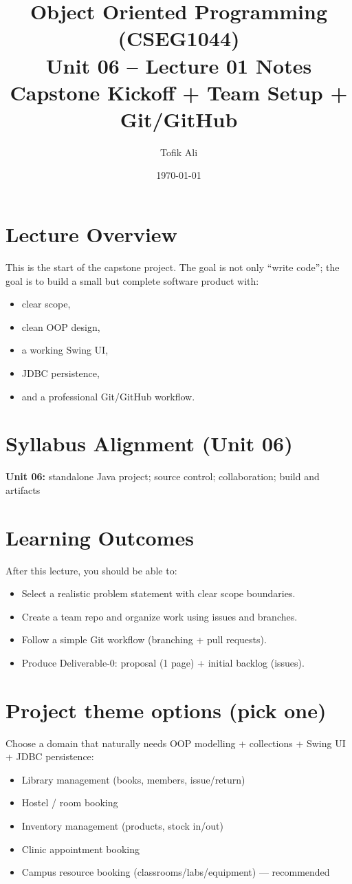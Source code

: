 \documentclass[11pt]{article}
\title{Object Oriented Programming (CSEG1044)\\Unit 06 -- Lecture 01 Notes\\Capstone Kickoff + Team Setup + Git/GitHub}
\author{Tofik Ali}
\date{\today}
\begin{document}
\maketitle
\tableofcontents

\section{Lecture Overview}
This is the start of the capstone project.
The goal is not only ``write code''; the goal is to build a small but complete software product with:
\begin{itemize}
  \item clear scope,
  \item clean OOP design,
  \item a working Swing UI,
  \item JDBC persistence,
  \item and a professional Git/GitHub workflow.
\end{itemize}
\notesources{\OOPSUnitVISources}

\section{Syllabus Alignment (Unit 06)}
\textbf{Unit 06:} standalone Java project; source control; collaboration; build and artifacts

\section{Learning Outcomes}
After this lecture, you should be able to:
\begin{itemize}
  \item Select a realistic problem statement with clear scope boundaries.
  \item Create a team repo and organize work using issues and branches.
  \item Follow a simple Git workflow (branching + pull requests).
  \item Produce Deliverable-0: proposal (1 page) + initial backlog (issues).
\end{itemize}

\section{Project theme options (pick one)}
Choose a domain that naturally needs OOP modelling + collections + Swing UI + JDBC persistence:
\begin{itemize}
  \item Library management (books, members, issue/return)
  \item Hostel / room booking
  \item Inventory management (products, stock in/out)
  \item Clinic appointment booking
  \item Campus resource booking (classrooms/labs/equipment) --- recommended
\end{itemize}
\end{document}
